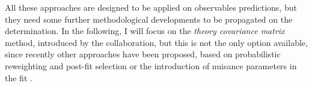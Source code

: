 All these approaches are designed to be applied on observables predictions, but
they need some further methodological developments to be propagated on the \pdf
determination.
In the following, I will focus on the \textit{theory covariance matrix}
method, introduced by the \nnpdf collaboration, but this is not the only option
available, since recently other approaches have been proposed, based on
probabilistic reweighting and post-fit selection \cite{Kassabov:2022orn} or the
introduction of nuisance parameters in the fit \cite{McGowan:2022nag}.
